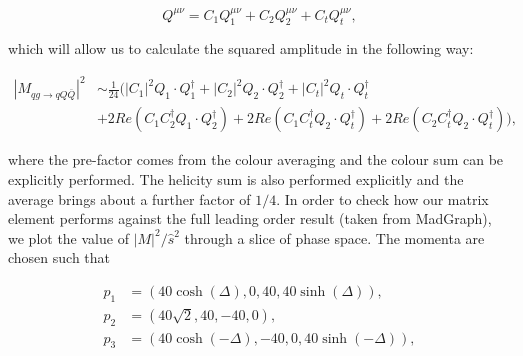 \begin{equation}
Q^{\mu \nu} = C_1 Q^{\mu \nu}_1 + C_2 Q^{\mu \nu}_2 + C_t Q^{\mu \nu}_t,
\end{equation}

which will allow us to calculate the squared amplitude in the following way:

\begin{equation}
\begin{split}
|M_{qg \to qQ\bar{Q}}|^2 &\sim \frac{1}{24} \bigg(|C_1|^2 Q_1\cdot Q_1^\dagger + |C_2|^2 Q_2 \cdot Q_2^\dagger + |C_t|^2 Q_t \cdot Q_t^\dagger \\
&+ 2 Re(C_1 C_2^\dagger Q_1 \cdot Q_2^{\dagger}) + 2 Re(C_1 C_t^\dagger Q_2 \cdot Q_t^\dagger) + 2 Re(C_2 C_t^\dagger Q_2 \cdot Q_t^\dagger) \bigg),
\end{split}
\end{equation}

where the pre-factor comes from the colour averaging and the colour sum can be explicitly performed. The helicity sum is also performed explicitly and the average brings about a further factor of $1/4$. In order to check how our matrix element performs against the full leading order result (taken from MadGraph), we plot the value of $|M|^2/\hat{s}^2$ through a slice of phase space. The momenta are chosen such that

\begin{equation}
\begin{split}
p_1 & = (40 \cosh(\Delta), 0, 40, 40 \sinh(\Delta)), \\
p_2 & = (40 \sqrt{2}, 40 , -40, 0), \\
p_3 & = (40 \cosh(-\Delta), -40, 0, 40 \sinh(-\Delta)), 
\end{split}
\end{equation}

